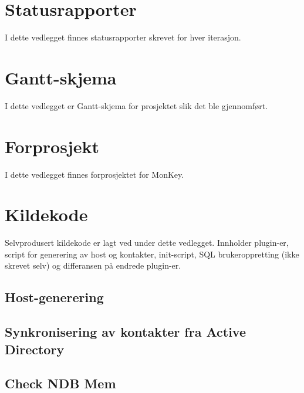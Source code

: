 \documentclass[a4paper,twoside,11pt,pdftex,norsk]{report}
\newcounter{includepdfpage}
\newcounter{currentpagecounter}
\newcommand{\addlabelstoallincludedpages}[1]{
   \refstepcounter{includepdfpage}
   \stepcounter{currentpagecounter}
	\appendix
   \label{#1.\thecurrentpagecounter}}
\newcommand{\modifiedincludepdf}[3]{
    \setcounter{currentpagecounter}{0}
    }
\newenvironment{changemargin}[2]{%
\begin{list}{}{%
\linespread{0.9}%
\setlength{\topsep}{0pt}%
\setlength{\leftmargin}{#1}%
\setlength{\rightmargin}{#2}%
\setlength{\listparindent}{\parindent}%
\setlength{\itemindent}{\parindent}%
\setlength{\parsep}{\parskip}%
}%
\item[]}{\end{list}}
\begin{document}
\begin{appendices}
\chapter{Statusrapporter}\label{app:statusrapporter}
I dette vedlegget finnes statusrapporter skrevet for hver iterasjon.







\chapter{Gantt-skjema}\label{app:gantt}
I dette vedlegget er Gantt-skjema for prosjektet slik det ble gjennomført.  

\chapter{Forprosjekt}\label{app:forprosjekt} I dette vedlegget finnes forprosjektet for MonKey.  %


\chapter{Kildekode}\label{app:kildekode}
Selvprodusert kildekode er lagt ved under dette vedlegget. Innholder plugin-er, script for generering av host og kontakter, init-script, SQL brukeroppretting (ikke skrevet selv) og differansen på endrede plugin-er.
\begin{changemargin}{-1cm}{-1cm}

\section{Host-generering}


\section{Synkronisering av kontakter fra Active Directory}


\section{Check NDB Mem}

\clearpage


\end{changemargin}
\end{appendices}
\end{document}
